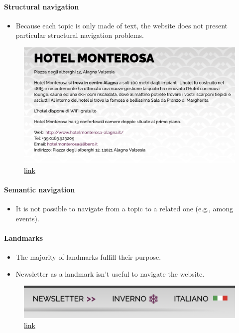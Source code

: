 \documentclass[a4paper, 11pt, parskip=half, headsepline]{scrreprt}
\begin{document}
\paragraph{Structural navigation}
\begin{itemize}
    \item Because each topic is only made of text, the website does not present particular structural navigation problems.
\end{itemize}

\begin{figure}[H]
        \centering
        \includegraphics[width=0.5\linewidth, keepaspectratio]{31-structural}
        \caption{\href{https://www.visitmonterosa.com/accommodation/hotel-monterosa/}{link}}
        \label{fig:interaction-consistency-05}
\end{figure}

\paragraph{Semantic navigation}
\begin{itemize}
    \item It is not possible to navigate from a topic to a related one (e.g., among events).
\end{itemize}

\paragraph{Landmarks}
\begin{itemize}
    \item The majority of landmarks fulfill their purpose.
    \item Newsletter as a landmark isn't useful to navigate the website.
\end{itemize}

\begin{figure}[H]
        \centering
        \includegraphics[width=0.3\linewidth, keepaspectratio]{51-landmarks}
        \caption{\href{https://www.visitmonterosa.com}{link}}
        \label{fig:landmarks-1}
\end{figure}
\end{document}
